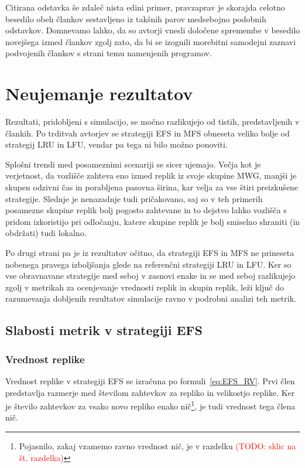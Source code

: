 \documentclass[a4paper, 12pt]{book}
\newcommand{\TODO}[1]{\textcolor{red}{(TODO: #1)}}
\begin{document}
Citirana odstavka še zdaleč nista edini primer, pravzaprav je skorajda
celotno besedilo obeh člankov sestavljeno iz takšnih parov medsebojno podobnih
odstavkov. Domnevamo lahko, da so avtorji vnesli določene spremembe v besedilo
novejšega izmed člankov zgolj zato, da bi se izognili morebitni samodejni
zaznavi podvojenih člankov s strani temu namenjenih programov.

\section{Neujemanje rezultatov}

Rezultati, pridobljeni s simulacijo, se močno razlikujejo od tistih,
predstavljenih v člankih. Po trditvah avtorjev se strategiji EFS in MFS
obneseta veliko bolje od strategij LRU in LFU, vendar pa tega ni bilo možno
ponoviti.

Splošni trendi med posameznimi scenariji se sicer ujemajo. Večja kot je
verjetnost, da vozlišče zahteva eno izmed replik iz svoje skupine MWG, manjši
je skupen odzivni čas in porabljena pasovna širina, kar velja za vse štiri
preizkušene strategije. Slednje je nenazadnje tudi pričakovano, saj so v teh
primerih posamezne skupine replik bolj pogosto zahtevane in to dejstvo lahko
vozlišča s pridom izkoristijo pri odločanju, katere skupine replik je bolj
smiselno shraniti (in obdržati) tudi lokalno.

Po drugi strani pa je iz rezultatov očitno, da strategiji EFS in MFS ne
prineseta nobenega pravega izboljšanja glede na referenčni strategiji LRU in
LFU. Ker so vse obravnavane strategije med seboj v zasnovi enake in se med
seboj razlikujejo zgolj v metrikah za ocenjevanje vrednosti replik in skupin
replik, leži ključ do razumevanja dobljenih rezultatov simulacije ravno v
podrobni analizi teh metrik.


\subsection{Slabosti metrik v strategiji EFS}

\subsubsection{Vrednost replike}

Vrednost replike v strategiji EFS se izračuna po formuli~\eqref{eq:EFS_RV}.
Prvi člen predstavlja razmerje med številom zahtevkov za repliko in velikostjo
replike. Ker je število zahtevkov za vsako novo repliko enako nič\footnote{%
Pojasnilo, zakaj vzamemo ravno vrednost nič, je v razdelku \TODO{sklic na
št. razdelka}}, je tudi vrednost tega člena nič.
\end{document}
